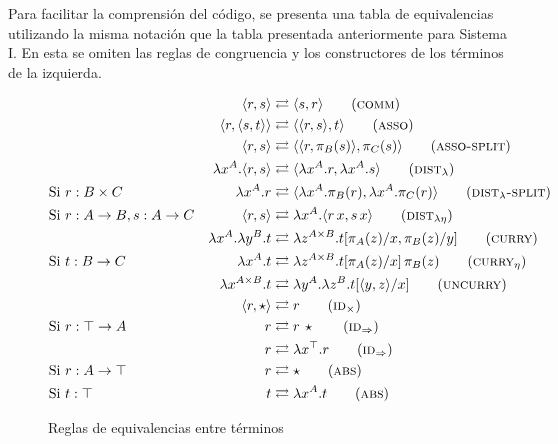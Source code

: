 Para facilitar la comprensión del código, se presenta una tabla de equivalencias utilizando la misma notación que la tabla presentada anteriormente para Sistema I.
En esta se omiten las reglas de congruencia y los constructores \const{[\_]$\equiv$\_} de los términos de la izquierda.

\begin{figure}[H]
	\centering
	\begin{align}
		& &\langle r,s \rangle &\rightleftarrows \langle s,r \rangle \tag{\textsc{comm}} \\
		& &\langle r, \langle s,t \rangle \rangle &\rightleftarrows \langle \langle r, s \rangle, t \rangle 	\tag{\textsc{asso}} \\
		& &\langle r, s \rangle &\rightleftarrows \langle \langle r, \pi_B (s) \rangle, \pi_C (s) \rangle 	\tag{\textsc{asso-split}} \\
		& &\lambda x^A. \langle r,s \rangle &\rightleftarrows \langle \lambda x^A.r, \lambda x^A.s \rangle 	\tag{$\textsc{dist}_{\lambda}$} \\
		&\text{Si } r: B \times C &\lambda x^A. r &\rightleftarrows \langle \lambda x^A. \pi_B(r), \lambda x^A.\pi_C(r) \rangle \tag{$\textsc{dist}_{\lambda}\textsc{-split}$} \\
		&\text{Si } r: A \rightarrow B, s : A \rightarrow C &\langle r,s \rangle &\rightleftarrows \lambda x^A. \langle r \, x,s \, x \rangle \tag{$\textsc{dist}_{\lambda\eta}$} \\
		& &\lambda x^A. \lambda y^B. t &\rightleftarrows \lambda z^{A \times B}. t[\pi_A(z)/x, \pi_B(z)/y]
		\tag{\textsc{curry}} \\
		&\text{Si } t: B \rightarrow C &\lambda x^A. t &\rightleftarrows \lambda z^{A \times B}. t[\pi_A(z)/x]\, \pi_B(z) \tag{$\textsc{curry}_{\eta}$} \\
		& &\lambda x^{A \times B}. t &\rightleftarrows \lambda y^A. \lambda z^B. t[\langle y, z \rangle/x] \tag{\textsc{uncurry}} \\
		& &\langle r, \star \rangle &\rightleftarrows r \tag{$\textsc{id}_\times$} \\
		&\text{Si } r: \top \rightarrow A &r &\rightleftarrows r \, \star \tag{$\textsc{id}_\Rightarrow$} \\
		& &r &\rightleftarrows \lambda x^\top. r \tag{$\textsc{id}_\Rightarrow$} \\
		&\text{Si } r: A \rightarrow \top &r &\rightleftarrows \star \tag{\textsc{abs}} \\
		&\text{Si } t: \top &t &\rightleftarrows \lambda x^A. t \tag{\textsc{abs}}
	\end{align}
	
	\caption{Reglas de equivalencias entre términos}
\end{figure}

